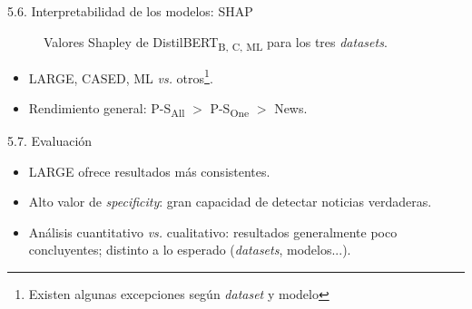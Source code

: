 \begin{frame}{5.6. Interpretabilidad de los modelos: SHAP}
\begin{figure}
    \caption{Valores Shapley de {DistilBERT}\textsubscript{B, C, ML} para los tres \textit{datasets}.}
\end{figure}

\begin{itemize}
    \item LARGE, CASED, ML \textit{vs.} otros\footnote{Existen algunas excepciones según \textit{dataset} y modelo}.
    \item Rendimiento general: {P-S}\textsubscript{All} $>$ {P-S}\textsubscript{One} $>$ {News}.
\end{itemize}

\end{frame}

\begin{frame}{5.7. Evaluación}
\begin{itemize}
    \item LARGE ofrece resultados más consistentes.
    \item Alto valor de \textit{specificity}: gran capacidad de detectar noticias verdaderas.
    \item Análisis cuantitativo \textit{vs.} cualitativo: resultados generalmente poco concluyentes; distinto a lo esperado (\textit{datasets}, modelos...).
\end{itemize}
    
\end{frame}